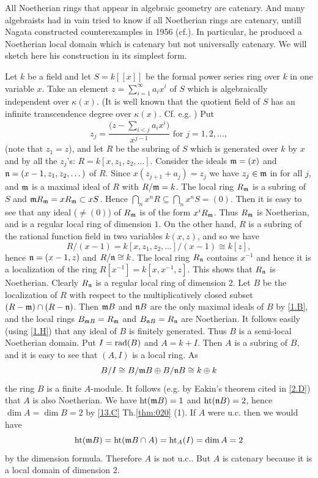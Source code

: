 \documentclass[../main]{subfiles}
\begin{document}
\begin{parexample}
All Noetherian rings that appear in algebraic geometry are catenary. And many algebraists had in vain tried to know if all Noetherian rings are catenary, untill Nagata constructed counterexamples in 1956 (cf.\cite[p.203, Example 2]{nagata1975local}). In particular, he produced a Noetherian local domain which is catenary but not universally catenary. We will sketch here his construction in its simplest form.

Let $k$ be a field and let $S=k[[x]]$ be the formal power series ring over $k$ in one variable $x$. Take an element $z=\sum_{i=1}^\infty a_i x^i$ of $S$ which is algebraically independent over $\kappa(x)$. (It is well known that the quotient field of $S$ has an infinite transcendence degree over $\kappa(x)$. Cf. e.g. \cite[Commutative Algebra, Vo1.II, p.220.]{zariski2014commutative}) Put 
\[z_j=\dfrac{\bigg(z-\displaystyle \sum_{i<j} a_i x^i\bigg)}{x^{j-1}} \text{ for } j=1,2, \ldots,\] (note that $z_1=z$), and let $R$ be the subring of $S$ which is generated over $k$ by $x$ and by all the $z_j$'s: $R=k[x, z_1, z_2, \ldots]$. Consider the ideals $\mathfrak{m}=(x)$ and $\mathfrak{n}=(x-1, z_1, z_2, \dots)$ of $R$. Since $x(z_{j+1}+a_j)=z_j$ we have $z_j \in\mathfrak{m}$ in for all $j$, and $\mathfrak{m}$ is a maximal ideal of $R$ with $R /\mathfrak{m}=k$. The local ring $R_{\mathfrak{m}}$ is a subring of $S$ and $\mathfrak{m}R_{\mathfrak{m}}=xR_{\mathfrak{m}}\subset xS$. Hence $\bigcap_nx^nR\subseteq\bigcap_nx^nS=(0)$. Then it is easy to see that any ideal ($\neq (0)$) of $R_{\mathfrak{m}}$ is of the form $x^iR_{\mathfrak{m}}$. Thus $R_{\mathfrak{m}}$ is Noetherian, and is a regular local ring of dimension $1$. On the other hand, $R$ is a subring of the rational function field in two variables $k(x,z)$, and so we have \[R/(x-1) = k[x,z_1,z_2,\ldots]/(x-1)\cong k[z],\] hence $\mathfrak{n}=(x-1, z)$ and $R/\mathfrak{n}\cong k$. The local ring $R_{\mathfrak{n}}$ contains $x^{-1}$ and hence it is a localization of the ring $R[x^{-1}] = k[x,x^{-1},z]$. This shows that $R_{\mathfrak{n}}$ is Noetherian. Clearly $R_{\mathfrak{n}}$ is a regular local ring of dimension $2$. Let $B$ be the localization of $R$ with respect to the multiplicatively closed subset $(R-\mathfrak{m})\cap(R-\mathfrak{n})$. Then $\mathfrak{m}B$ and $\mathfrak{n}B$ are the only maximal ideals of $B$ by \ref{1.B}, and the local rings $B_{\mathfrak{m}B} = R_{\mathfrak{m}}$ and $B_{\mathfrak{n}B} = R_{\mathfrak{n}}$ are Noetherian. It follows easily (using \ref{1.H}) that any ideal of $B$ is finitely generated. Thus $B$ is a semi-local Noetherian domain. Put $I = \operatorname{rad}(B)$ and $A=k+I$. Then $A$ is a subring of $B$, and it is easy to see that $(A,I)$ is a local ring. As \[B/I \cong B/\mathfrak{m}B \oplus B/\mathfrak{n}B \cong k \oplus k\] the ring $B$ is a finite $A$-module. It follows (e.g. by Eakin's theorem cited in \ref{2.D}) that $A$ is also Noetherian. We have $\operatorname{ht}(\mathfrak{m}B) = 1$ and $\operatorname{ht}(\mathfrak{n}B) = 2$, hence $\dim A = \dim B = 2$ by \ref{13.C} Th.\ref{thm:020} (1). If $A$ were u.c. then we would have \[\operatorname{ht}(\mathfrak{m}B) = \operatorname{ht}(\mathfrak{m}B\cap A)=\operatorname{ht}_A(I)=\operatorname{dim} A = 2\] by the dimension formula. Therefore $A$ is not u.c.. But $A$ is catenary because it is a local domain of dimension $2$. 
\end{parexample}
\end{document}
